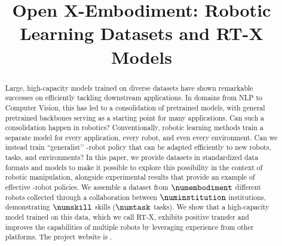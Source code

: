 \title{Open X-Embodiment: Robotic Learning Datasets and RT-X Models}



\makeatletter
\let\@oldmaketitle\@maketitle%
\renewcommand{\@maketitle}{\@oldmaketitle%
\vspace{0.15em}
  \includegraphics[width=\linewidth]
    {figures/data_vis_v3.jpg}
    \captionof{figure}{\small We propose an open, large-scale dataset for robot learning curated from $\numinstitution$ institutions across the globe. The dataset represents diverse behaviors, robot embodiments and environments, and enables learning generalized robotic policies.}
    \vspace{-1.35em}
    \label{fig:teaser}
    }%
\makeatother

\maketitle
\pagestyle{empty}

\addtocounter{figure}{-1}

\begin{abstract}
Large, high-capacity models trained on diverse datasets have shown remarkable successes on efficiently tackling downstream applications. In domains from NLP to Computer Vision, this has led to a consolidation of pretrained models, with general pretrained backbones serving as a starting point for many applications. Can such a consolidation happen in robotics? Conventionally, robotic learning methods train a separate model for every application, every robot, and even every environment. Can we instead train ``generalist’’ \cro-robot policy that can be adapted efficiently to new robots, tasks, and environments? In this paper, we provide datasets in standardized data formats and models to make it possible to explore this possibility in the context of robotic manipulation, alongside experimental results that provide an example of effective \cro-robot policies. We assemble a dataset from $\numembodiment$ different robots collected through a collaboration between $\numinstitution$ institutions, demonstrating $\numskill$ skills ($\numtask$ tasks). We show that a high-capacity model trained on this data, which we call RT-X, exhibits positive transfer and improves the capabilities of multiple robots by leveraging experience from other platforms. The project website is \repourl.
\end{abstract}
\vspace{-0.4em}

\vspace{-0.1cm}
